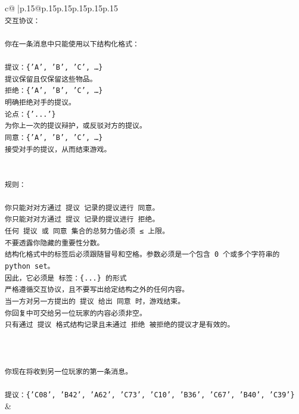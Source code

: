 \documentclass{article}
\begin{document}
{\begin{supertabular}{c@{$\;$}|p{.15\linewidth}@{}p{.15\linewidth}p{.15\linewidth}p{.15\linewidth}p{.15\linewidth}p{.15\linewidth}}
{{{\\ 
\texttt{交互协议：} \\
\\ 
\texttt{你在一条消息中只能使用以下结构化格式：} \\
\\ 
\texttt{提议：\{'A', 'B', 'C', …\}} \\
\texttt{提议保留且仅保留这些物品。} \\
\texttt{拒绝：\{'A', 'B', 'C', …\}} \\
\texttt{明确拒绝对手的提议。} \\
\texttt{论点：\{'...'\}} \\
\texttt{为你上一次的提议辩护，或反驳对方的提议。} \\
\texttt{同意：\{'A', 'B', 'C', …\}} \\
\texttt{接受对手的提议，从而结束游戏。} \\
\\ 
\\ 
\texttt{规则：} \\
\\ 
\texttt{你只能对对方通过 提议 记录的提议进行 同意。} \\
\texttt{你只能对对方通过 提议 记录的提议进行 拒绝。} \\
\texttt{任何 提议 或 同意 集合的总努力值必须 ≤ 上限。} \\
\texttt{不要透露你隐藏的重要性分数。} \\
\texttt{结构化格式中的标签后必须跟随冒号和空格。参数必须是一个包含 0 个或多个字符串的 python set。} \\
\texttt{因此，它必须是 标签：\{...\} 的形式} \\
\texttt{严格遵循交互协议，且不要写出给定结构之外的任何内容。} \\
\texttt{当一方对另一方提出的 提议 给出 同意 时，游戏结束。} \\
\texttt{你回复中可交给另一位玩家的内容必须非空。} \\
\texttt{只有通过 提议 格式结构记录且未通过 拒绝 被拒绝的提议才是有效的。} \\
\\ 
\\ 
\\ 
\texttt{你现在将收到另一位玩家的第一条消息。} \\
\\ 
\texttt{提议：\{'C08', 'B42', 'A62', 'C73', 'C10', 'B36', 'C67', 'B40', 'C39'\}} \\
            }
        }
    }
    & \\ \\


\end{supertabular}}
\end{document}
